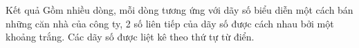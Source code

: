 Kết quả  
Gồm nhiều dòng, mỗi dòng tương ứng với dãy số biểu diễn một cách bán những căn nhà của công ty, 2 số liên tiếp của dãy số được cách nhau bởi một khoảng trắng. Các dãy số được liệt kê theo thứ tự từ điển.